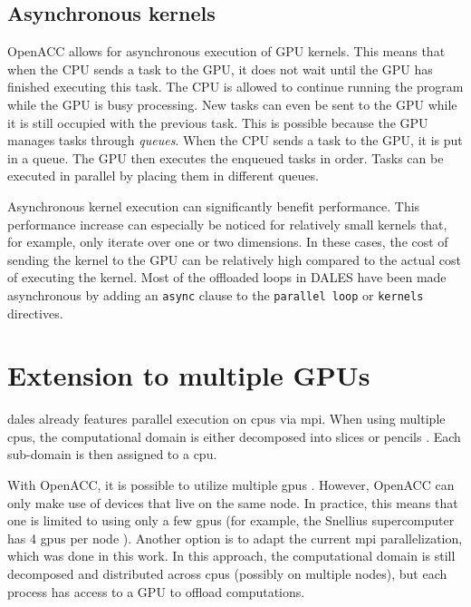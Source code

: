 \subsection{Asynchronous kernels}
OpenACC allows for asynchronous execution of GPU kernels. This means that when the CPU sends a task to the GPU, it does not wait until the GPU has finished executing this task. The CPU is allowed to continue running the program while the GPU is busy processing. New tasks can even be sent to the GPU while it is still occupied with the previous task. This is possible because the GPU manages tasks through \emph{queues}. When the CPU sends a task to the GPU, it is put in a queue. The GPU then executes the enqueued tasks in order. Tasks can be executed in parallel by placing them in different queues.

Asynchronous kernel execution can significantly benefit performance. This performance increase can especially be noticed for relatively small kernels that, for example, only iterate over one or two dimensions. In these cases, the cost of sending the kernel to the GPU can be relatively high compared to the actual cost of executing the kernel. Most of the offloaded loops in DALES have been made asynchronous by adding an \texttt{async} clause to the \texttt{parallel loop} or \texttt{kernels} directives. 

\newpage

\section{Extension to multiple GPUs}
\acrshort{dales} already features parallel execution on \acrshort{cpu}s via \acrfull{mpi}. When using multiple \acrshort{cpu}s, the computational domain is either decomposed into slices or pencils . Each sub-domain is then assigned to a \acrshort{cpu}. 

With OpenACC, it is possible to utilize multiple \acrshort{gpu}s \citep{farberParallelProgrammingOpenACC2017}. However, OpenACC can only make use of devices that live on the same node. In practice, this means that one is limited to using only a few \acrshort{gpu}s (for example, the Snellius supercomputer has 4 \acrshort{gpu}s per node \citep{surfSnelliusHardwareFile}). Another option is to adapt the current \acrshort{mpi} parallelization, which was done in this work. In this approach, the computational domain is still decomposed and distributed across \acrshort{cpu}s (possibly on multiple nodes), but each process has access to a GPU to offload computations. 

